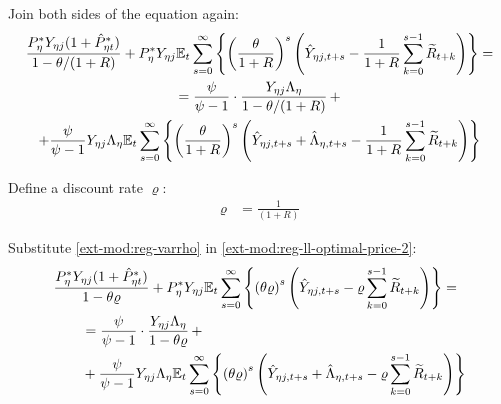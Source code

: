\documentclass[../thesis.tex]{subfiles}
\begin{document}
Join both sides of the equation again:
\begin{multline}
	\frac{ P_{\eta}^{\ast} Y_{\eta j} ( 1 + \hat{P}_{\eta t}^{\ast} )}{1-\theta /(1+R)} + P_{\eta}^{\ast} Y_{\eta j} {\mathbb{E}_{t}} \sum_{s=0}^{\infty} \left\{ \left( \frac{\theta}{1 + R} \right)^s \left( \hat{Y}_{\eta j, t+s} - \frac{1}{1 + R} \sum_{k=0}^{s-1} \widetilde{R}_{t+k} \right) \right\} = 
	\\
	= \frac{\psi}{\psi-1} \cdot \frac{Y_{\eta j} \Lambda_{\eta}}{1-\theta /(1+R)} \, + 
	\\
	+ \frac{\psi}{\psi-1} Y_{\eta j} \Lambda_{\eta} {\mathbb{E}_{t}} \sum_{s=0}^{\infty} \left\{ \left( \frac{\theta}{1 + R} \right)^s \left( \hat{Y}_{\eta j, t+s} + \hat{\Lambda}_{\eta, t+s} - \frac{1}{1 + R} \sum_{k=0}^{s-1} \widetilde{R}_{t+k} \right) \right\} \label{ext-mod:reg-ll-optimal-price-2}
\end{multline}


Define a discount rate $\varrho$:
\begin{align}
	\varrho &= \frac{1}{(1 + R)} \label{ext-mod:reg-varrho}
\end{align}

Substitute \ref{ext-mod:reg-varrho} in \ref{ext-mod:reg-ll-optimal-price-2}:
\begin{align}
	\begin{split} & \frac{ P_{\eta}^{\ast} Y_{\eta j} ( 1 + \hat{P}_{\eta t}^{\ast} )}{1- \theta \varrho} + P_{\eta}^{\ast} Y_{\eta j} {\mathbb{E}_{t}} \sum_{s=0}^{\infty} \left\{ \left( \theta \varrho \right)^s \left( \hat{Y}_{\eta j, t+s} - \varrho \sum_{k=0}^{s-1} \widetilde{R}_{t+k} \right) \right\} = \\ & \qquad = \frac{\psi}{\psi-1} \cdot \frac{Y_{\eta j} \Lambda_{\eta}}{1- \theta \varrho} \, + \\ & \qquad + \frac{\psi}{\psi-1} Y_{\eta j} \Lambda_{\eta} {\mathbb{E}_{t}} \sum_{s=0}^{\infty} \left\{ \left( \theta \varrho \right)^s \left( \hat{Y}_{\eta j, t+s} + \hat{\Lambda}_{\eta, t+s} - \varrho \sum_{k=0}^{s-1} \widetilde{R}_{t+k} \right) \right\} \end{split} \label{ext-mod:reg-ll-optimal-price-3}
\end{align}
\end{document}
